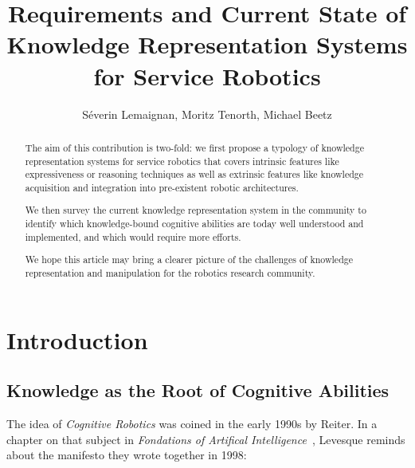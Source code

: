 \documentclass[a4paper, twocolumn]{article}
\title{Requirements and Current State of Knowledge Representation Systems for Service Robotics}
\author{Séverin Lemaignan, Moritz Tenorth, Michael Beetz}
\begin{document}
\maketitle
\tableofcontents


\begin{abstract}

The aim of this contribution is two-fold: we first propose a typology of
knowledge representation systems for service robotics that covers intrinsic
features like expressiveness or reasoning techniques as well as extrinsic
features like knowledge acquisition and integration into pre-existent robotic
architectures.

We then survey the current knowledge representation system in the community to
identify which knowledge-bound cognitive abilities are today well understood
and implemented, and which would require more efforts.

We hope this article may bring a clearer picture of the challenges of knowledge
representation and manipulation for the robotics research community.

\end{abstract}

\section{Introduction}
\label{sect|intro}

\subsection{Knowledge as the Root of Cognitive Abilities}
\label{sect|cognitive-abilities}

The idea of \emph{Cognitive Robotics} was coined in the early 1990s by Reiter.
In a chapter on that subject in \emph{Fondations of Artifical
Intelligence}~\cite{Levesque2008}, Levesque reminds about the manifesto they
wrote together in 1998:
\end{document}
